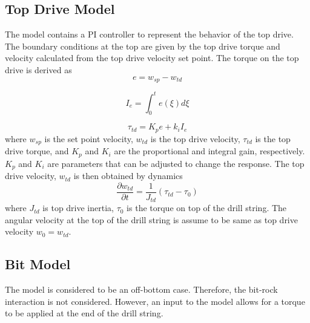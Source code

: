 \subsection{Top Drive Model}
The model contains a PI controller to represent the behavior of the top drive. The boundary conditions at the top are given by the top drive torque and velocity calculated from the top drive velocity set point. The torque on the top drive is derived as
\begin{equation}\label{AS_err}
  e = w_{sp} - w_{td}
\end{equation}

\begin{equation}\label{AS_Ie}
  I_e = \int_{0}^{t}e(\xi)d\xi
\end{equation}

\begin{equation}\label{AS_tau_m}
  \tau_{td} = K_pe + k_i I_e
\end{equation}
where $w_{sp}$ is the set point velocity, $w_{td}$ is the top drive velocity, $\tau_{td}$ is the top drive torque, and $K_p$ and $K_i$ are the proportional and integral gain, respectively. $K_p$ and $K_i$ are parameters that can be adjusted to change the response. The top drive velocity, $w_{td}$ is then obtained by dynamics
\begin{equation}\label{AS_w_td}
  \frac{\partial w_{td}}{\partial t} = \frac{1}{J_{td}}(\tau_{td} - \tau_0)
\end{equation}
where $J_{td}$ is top drive inertia, $\tau_{0}$ is the torque on top of the drill string. The angular velocity at the top of the drill string is assume to be same as top drive velocity $w_0 = w_{td}$.

\subsection{Bit Model}
\label{sec:asbitmodel}
The model is considered to be an off-bottom case.  Therefore, the bit-rock interaction is not considered.  However, an input to the model allows for a torque to be applied at the end of the drill string.

